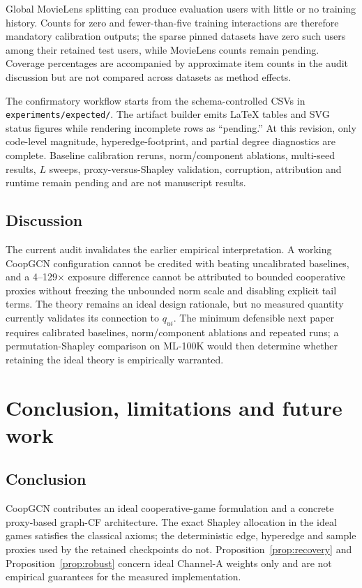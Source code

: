 \documentclass[a4paper,fleqn,longmktitle]{cas-dc}
\begin{document}
Global MovieLens splitting can produce evaluation users with little or no
training history. Counts for zero and fewer-than-five training interactions are
therefore mandatory calibration outputs; the sparse pinned datasets have zero
such users among their retained test users, while MovieLens counts remain
pending. Coverage percentages are accompanied by approximate item counts in
the audit discussion but are not compared across datasets as method effects.

The confirmatory workflow starts from the schema-controlled CSVs in
\texttt{experiments/expected/}. The artifact builder emits LaTeX tables and SVG
status figures while rendering incomplete rows as ``pending.'' At this
revision, only code-level magnitude, hyperedge-footprint, and partial degree
diagnostics are complete. Baseline calibration reruns, norm/component
ablations, multi-seed results, $L$ sweeps, proxy-versus-Shapley validation,
corruption, attribution and runtime remain pending and are not manuscript
results.

\subsection{Discussion}
\label{sec:discussion}

The current audit invalidates the earlier empirical interpretation. A working
CoopGCN configuration cannot be credited with beating uncalibrated baselines,
and a 4--129$\times$ exposure difference cannot be attributed to bounded
cooperative proxies without freezing the unbounded norm scale and disabling
explicit tail terms. The theory remains an ideal design rationale, but no
measured quantity currently validates its connection to $q_{ui}$. The
minimum defensible next paper requires calibrated baselines, norm/component
ablations and repeated runs; a permutation-Shapley comparison on ML-100K would
then determine whether retaining the ideal theory is empirically warranted.

\section{Conclusion, limitations and future work}
\label{sec:conclusion}

\subsection{Conclusion}

CoopGCN contributes an ideal cooperative-game formulation and a concrete
proxy-based graph-CF architecture. The exact Shapley allocation in the ideal
games satisfies the classical axioms; the deterministic edge, hyperedge and
sample proxies used by the retained checkpoints do not. Proposition~\ref{prop:recovery}
and Proposition~\ref{prop:robust} concern ideal Channel-A weights only and are
not empirical guarantees for the measured implementation.
\end{document}
